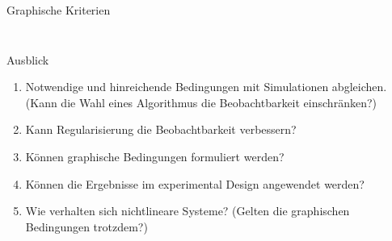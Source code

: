 \begin{frame}{Graphische Kriterien}
\begin{columns}[T]
\begin{column}{.48\textwidth}
\begin{figure}[h]
	\end{figure}
	\end{column}
	\end{columns}
\end{frame}

\begin{frame}{Ausblick}
	\begin{enumerate}
	\item Notwendige und hinreichende Bedingungen mit Simulationen abgleichen. (Kann die Wahl eines Algorithmus 
	die Beobachtbarkeit einschränken?) \pause
	\item Kann Regularisierung die Beobachtbarkeit verbessern?\pause
	\item Können graphische Bedingungen formuliert werden? \pause
	\item Können die Ergebnisse im experimental Design angewendet werden? \pause
	\item Wie verhalten sich nichtlineare Systeme? (Gelten die graphischen Bedingungen trotzdem?) \pause
	\end{enumerate}
\end{frame}

